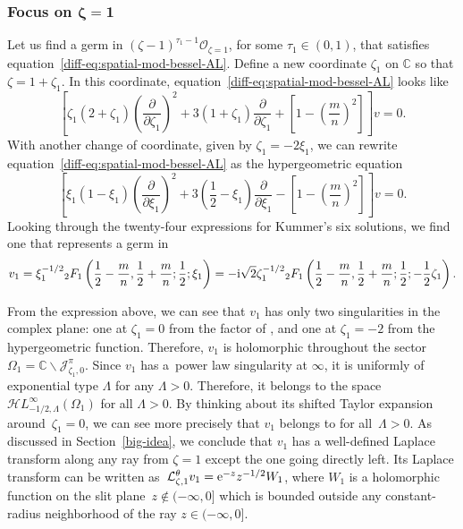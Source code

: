 \documentclass[10pt,a4paper]{amsart}
\newcommand{\singexp}[2]{\mathcal{H}L^\infty_{#1, #2}}
\newcommand{\C}{\mathbb{C}}
\newcommand{\laplace}{\mathcal{L}}
\numberwithin{equation}{section}
\begin{document}
\subsubsection[Focus on zeta = 1]{Focus on $\boldsymbol{\zeta = 1}$}\label{pos-root-AL}
%
Let us find a germ in $(\zeta-1)^{\tau_1-1} \mathcal{O}_{\zeta=1}$, for some $\tau_1 \in (0, 1)$, that satisfies equation~\eqref{diff-eq:spatial-mod-bessel-AL}. Define a new coordinate $\zeta_1$ on $\C$ so that $\zeta = 1 + \zeta_1$. In this coordinate, equation~\eqref{diff-eq:spatial-mod-bessel-AL} looks like
\[%
\left[\zeta_1(2 + \zeta_1) \left(\frac{\partial}{\partial \zeta_1}\right)^2 + 3(1 + \zeta_1) \frac{\partial}{\partial \zeta_1} + \left[1 - \left(\frac{m}{n}\right)^2\right]\right] v = 0.
\]
With another change of coordinate, given by $\zeta_1 = -2\xi_1$, we can rewrite equation~\eqref{diff-eq:spatial-mod-bessel-AL} as the hypergeometric equation
\[%
\left[\xi_1 (1 - \xi_1) \left(\frac{\partial}{\partial \xi_1}\right)^2 + 3(\frac{1}{2} - \xi_1) \frac{\partial}{\partial \xi_1} - \left[1 - \left(\frac{m}{n}\right)^2\right]\right] v = 0.
\]
Looking through the twenty-four expressions for Kummer's six solutions, we find one \cite[formula~(15.10.12)]{dlmf} that represents a germ in 
\begin{gather*}
v_1 = \xi_1^{-1/2} {}_2F_1\left(\frac{1}{2}-\frac{m}{n}, \frac{1}{2}+\frac{m}{n}; \frac{1}{2}; \xi_1\right) = -{\rm i}\sqrt{2} \zeta_1^{-1/2} {}_2F_1\left(\frac{1}{2}-\frac{m}{n}, \frac{1}{2}+\frac{m}{n}; \frac{1}{2}; -\frac{1}{2}\zeta_1\right).
\end{gather*}

From the expression above, we can see that $v_1$ has only two singularities in the complex plane: one at $\zeta_1 = 0$ from the factor of , and one at $\zeta_1 = -2$ from the hypergeometric function. Therefore, $v_1$ is holomorphic throughout the sector $\Omega_1 = \C \smallsetminus \mathcal{J}^\pi_{\zeta_1, 0}$. Since $v_1$ has a~power law singularity at $\infty$, it is uniformly of exponential type $\Lambda$ for any $\Lambda > 0$. Therefore, it belongs to the space $\singexp{-1/2}{\Lambda}(\Omega_1)$ for all $\Lambda > 0$. By thinking about its shifted Taylor expansion around~${\zeta_1 = 0}$, we can see more precisely that $v_1$ belongs to
\smash{$ -{\rm i}\sqrt{2} \zeta_1^{-1/2} + \singexp{1/2}{\Lambda}(\Omega_1) $}
for all~${\Lambda > 0}$. As discussed in Section~\ref{big-idea}, we conclude that $v_1$ has a well-defined Laplace transform along any ray from $\zeta = 1$ except the one going directly left. Its Laplace transform can be written as~${\laplace^\theta_{\zeta, 1} v_1 = {\rm e}^{-z} z^{-1/2} W_1}$,
where $W_1$ is a holomorphic function on the slit plane~${z \notin (-\infty, 0]}$ which is bounded outside any constant-radius neighborhood of the ray $z \in (-\infty, 0]$.
%
\end{document}
